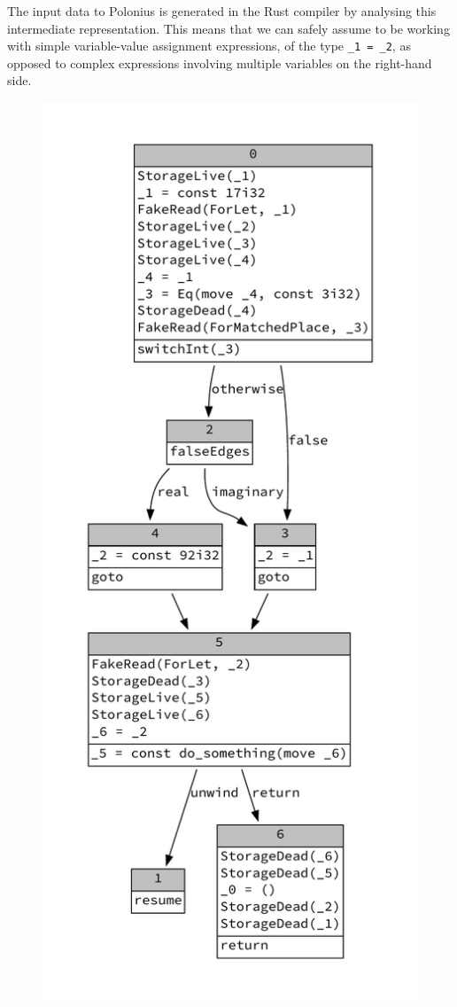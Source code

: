 \documentclass[11pt,a4paper,twoside,openany]{report}
\newcommand{\InRust}[1]{\texttt{#1}}
\renewcommand\_{\textunderscore\allowbreak}
\begin{document}
The input data to Polonius is generated in the Rust compiler by analysing this
intermediate representation. This means that we can safely assume to be working
with simple variable-value assignment expressions, of the type \InRust{_1 = _2},
as opposed to complex expressions involving multiple variables on the right-hand
side.

\begin{figure}
\noindent
\begin{minipage}{.5\textwidth}
\includegraphics[width=\linewidth]{Graphs/mir-example}

\end{minipage}
\end{figure}
\end{document}
